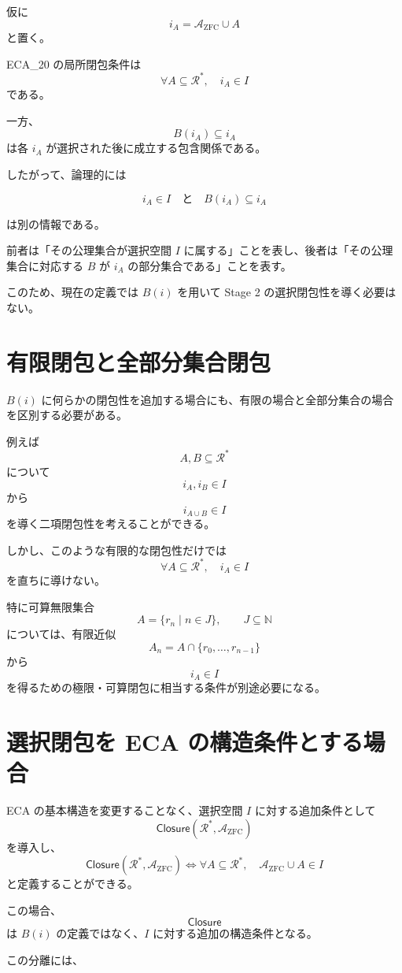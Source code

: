 \documentclass[a4paper,11pt]{ltjsarticle}
\begin{document}
仮に
\[
i_A=\mathcal{A}_{\mathrm{ZFC}}\cup A
\]
と置く。

ECA_20 の局所閉包条件は
\[
\forall A\subseteq\mathcal{R}^*,
\quad i_A\in I
\]
である。

一方、
\[
B(i_A)\subseteq i_A
\]
は各 $i_A$ が選択された後に成立する包含関係である。

したがって、論理的には

\[
\boxed{
i_A\in I
\quad\text{と}\quad
B(i_A)\subseteq i_A
}
\]

は別の情報である。

前者は「その公理集合が選択空間 $I$ に属する」ことを表し、後者は「その公理集合に対応する $B$ が $i_A$ の部分集合である」ことを表す。

このため、現在の定義では $B(i)$ を用いて Stage 2 の選択閉包性を導く必要はない。

\section{有限閉包と全部分集合閉包}

$B(i)$ に何らかの閉包性を追加する場合にも、有限の場合と全部分集合の場合を区別する必要がある。

例えば
\[
A,B\subseteq\mathcal{R}^*
\]
について
\[
i_A,i_B\in I
\]
から
\[
i_{A\cup B}\in I
\]
を導く二項閉包性を考えることができる。

しかし、このような有限的な閉包性だけでは
\[
\forall A\subseteq\mathcal{R}^*,
\quad i_A\in I
\]
を直ちに導けない。

特に可算無限集合
\[
A=\{r_n\mid n\in J\},
\qquad J\subseteq\mathbb{N}
\]
については、有限近似
\[
A_n=A\cap\{r_0,\ldots,r_{n-1}\}
\]
から
\[
i_A\in I
\]
を得るための極限・可算閉包に相当する条件が別途必要になる。

\section{選択閉包を ECA の構造条件とする場合}

ECA の基本構造を変更することなく、選択空間 $I$ に対する追加条件として
\[
\mathsf{Closure}(\mathcal{R}^*,\mathcal{A}_{\mathrm{ZFC}})
\]
を導入し、
\[
\mathsf{Closure}(\mathcal{R}^*,\mathcal{A}_{\mathrm{ZFC}})
\iff
\forall A\subseteq\mathcal{R}^*,
\quad
\mathcal{A}_{\mathrm{ZFC}}\cup A\in I
\]
と定義することができる。

この場合、
\[
\mathsf{Closure}
\]
は $B(i)$ の定義ではなく、$I$ に対する追加の構造条件となる。

この分離には、
\end{document}
